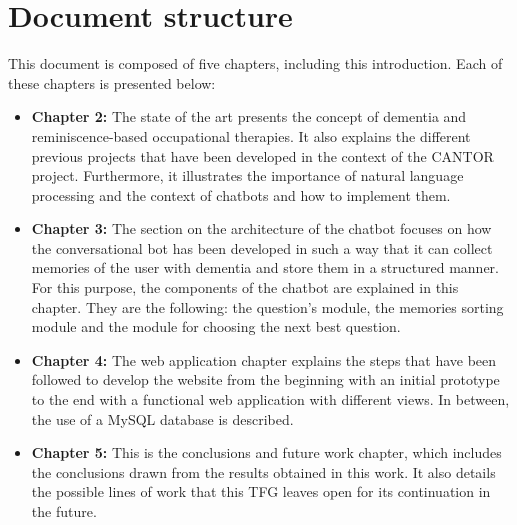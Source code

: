 \section{Document structure}

This document is composed of five chapters, including this introduction. Each of these chapters is presented below: 

\begin{itemize}
	\item \textbf{Chapter 2:} The state of the art presents the concept of dementia and reminiscence-based occupational therapies. It also explains the different previous projects that have been developed in the context of the CANTOR project. Furthermore, it illustrates the importance of natural language processing and the context of chatbots and how to implement them.
	\item \textbf{Chapter 3:} The section on the architecture of the chatbot focuses on how the conversational bot has been developed in such a way that it can collect memories of the user with dementia and store them in a structured manner. For this purpose, the components of the chatbot are explained in this chapter. They are the following: the question's module, the memories sorting module and the module for choosing the next best question. 
	\item \textbf{Chapter 4:} The web application chapter explains the steps that have been followed to develop the website from the beginning with an initial prototype to the end with a functional web application with different views. In between, the use of a MySQL database is described.
	\item \textbf{Chapter 5:} This is the conclusions and future work chapter, which includes the conclusions drawn from the results obtained in this work. It also details the possible lines of work that this TFG leaves open for its continuation in the future.
\end{itemize}







